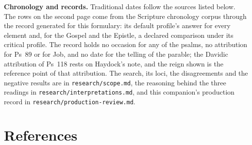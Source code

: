 {\textbf{Chronology and records.} Traditional dates follow the  sources listed below. The rows on the second page come from the
Scripture chronology corpus through the record generated for this formulary: its
default profile's answer for every element and, for the Gospel and the Epistle, a
declared comparison under its critical profile. The record holds no occasion for
any of the psalms, no attribution for Ps~89 or for Job, and no date for the
telling of the parable; the Davidic attribution of Ps~118 rests on Haydock's note,
and the reign shown is the reference point of that attribution. The search, its
loci, the disagreements and the negative results are in
\texttt{research/scope.md}, the reasoning behind the three readings in
\texttt{research/interpretations.md}, and this companion's production record in
\texttt{research/production-review.md}.
\par}

\section*{References}


